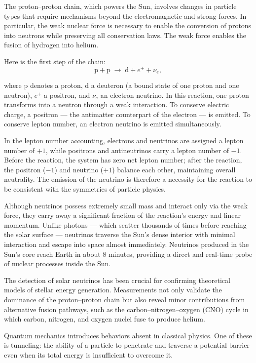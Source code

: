 The proton–proton chain, which powers the Sun, involves changes in particle types that require mechanisms beyond the electromagnetic and strong forces. In particular, the weak nuclear force is necessary to enable the conversion of protons into neutrons while preserving all conservation laws. The weak force enables the fusion of hydrogen into helium.

Here is the first step of the chain:
\[
\text{p} + \text{p} \;\to\; \text{d} + e^+ + \nu_e,
\]

where $\text{p}$ denotes a proton, $\text{d}$ a deuteron (a bound state of one proton and one neutron), $e^+$ a positron, and $\nu_e$ an electron neutrino. In this reaction, one proton transforms into a neutron through a weak interaction. To conserve electric charge, a positron — the antimatter counterpart of the electron — is emitted. To conserve lepton number, an electron neutrino is emitted simultaneously. 

In the lepton number accounting, electrons and neutrinos are assigned a lepton number of $+1$, while positrons and antineutrinos carry a lepton number of $-1$. Before the reaction, the system has zero net lepton number; after the reaction, the positron ($-1$) and neutrino ($+1$) balance each other, maintaining overall neutrality. The emission of the neutrino is therefore a necessity for the reaction to be consistent with the symmetries of particle physics.

Although neutrinos possess extremely small mass and interact only via the weak force, they carry away a significant fraction of the reaction's energy and linear momentum. Unlike photons — which scatter thousands of times before reaching the solar surface — neutrinos traverse the Sun's dense interior with minimal interaction and escape into space almost immediately. Neutrinos produced in the Sun's core reach Earth in about 8 minutes, providing a direct and real-time probe of nuclear processes inside the Sun.

The detection of solar neutrinos has been crucial for confirming theoretical models of stellar energy generation. Measurements not only validate the dominance of the proton–proton chain but also reveal minor contributions from alternative fusion pathways, such as the carbon–nitrogen–oxygen (CNO) cycle in which carbon, nitrogen, and oxygen nuclei fuse to produce helium.

Quantum mechanics introduces behaviors absent in classical physics. One of these is tunneling: the ability of a particle to penetrate and traverse a potential barrier even when its total energy is insufficient to overcome it. 

